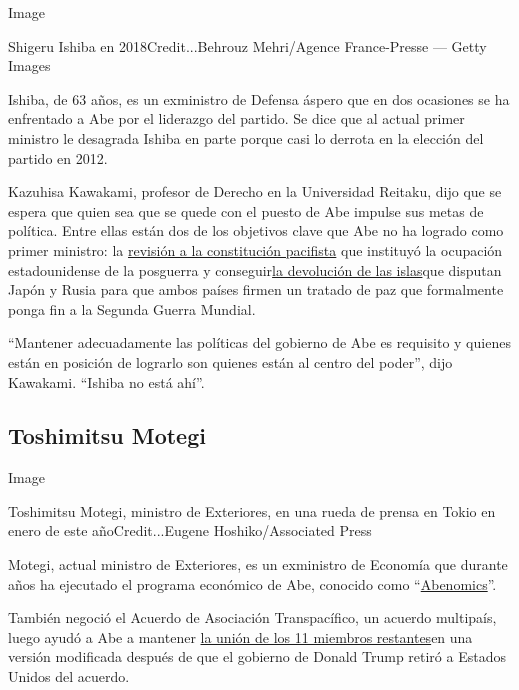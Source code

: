 Image

Shigeru Ishiba en 2018Credit...Behrouz Mehri/Agence France-Presse ---
Getty Images

Ishiba, de 63 años, es un exministro de Defensa áspero que en dos
ocasiones se ha enfrentado a Abe por el liderazgo del partido. Se dice
que al actual primer ministro le desagrada Ishiba en parte porque casi
lo derrota en la elección del partido en 2012.

Kazuhisa Kawakami, profesor de Derecho en la Universidad Reitaku, dijo
que se espera que quien sea que se quede con el puesto de Abe impulse
sus metas de política. Entre ellas están dos de los objetivos clave que
Abe no ha logrado como primer ministro: la
\href{https://www.nytimes3xbfgragh.onion/2017/05/03/world/asia/japan-constitution-shinzo-abe-military.html?searchResultPosition=1}{revisión
a la constitución pacifista} que instituyó la ocupación estadounidense
de la posguerra y
conseguir\href{https://www.nytimes3xbfgragh.onion/2019/01/22/world/europe/kuril-islands-putin-abe.html}{la
devolución de las islas}que disputan Japón y Rusia para que ambos países
firmen un tratado de paz que formalmente ponga fin a la Segunda Guerra
Mundial.

``Mantener adecuadamente las políticas del gobierno de Abe es requisito
y quienes están en posición de lograrlo son quienes están al centro del
poder'', dijo Kawakami. ``Ishiba no está ahí''.

\hypertarget{toshimitsu-motegi}{%
\subsection{Toshimitsu Motegi}\label{toshimitsu-motegi}}

Image

Toshimitsu Motegi, ministro de Exteriores, en una rueda de prensa en
Tokio en enero de este añoCredit...Eugene Hoshiko/Associated Press

Motegi, actual ministro de Exteriores, es un exministro de Economía que
durante años ha ejecutado el programa económico de Abe, conocido como
``\href{https://www.nytimes3xbfgragh.onion/es/2020/08/28/espanol/mundo/shinzo-abe-japon.html}{Abenomics}''.

También negoció el Acuerdo de Asociación Transpacífico, un acuerdo
multipaís, luego ayudó a Abe a mantener
\href{https://www.nytimes3xbfgragh.onion/2018/03/08/world/asia/us-trump-tpp-signed.html}{la
unión de los 11 miembros restantes}en una versión modificada después de
que el gobierno de Donald Trump retiró a Estados Unidos del acuerdo.

